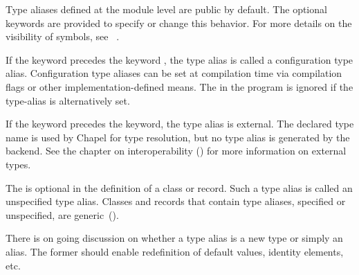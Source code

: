 Type aliases defined at the module level are public by default.  The
optional  keywords are provided to specify or
change this behavior.  For more details on the visibility of symbols,
see ~.

If the keyword  precedes the keyword , the
type alias is called a configuration type alias.  Configuration type
aliases can be set at compilation time via compilation flags or other
implementation-defined means.  The  in the
program is ignored if the type-alias is alternatively set.

If the keyword  precedes the  keyword, the type alias is
external.  The declared type name is used by Chapel for type resolution, but no
type alias is generated by the backend.  See the chapter on interoperability
() for more information on external types.

The  is optional in the definition of a class or
record.  Such a type alias is called an unspecified type
alias. Classes and records that contain type aliases, specified or
unspecified, are generic~().

\begin{openissue}
There is on going discussion on whether a type alias is a new
type or simply an alias.  The former should enable redefinition of
default values, identity elements, etc.
\end{openissue}
